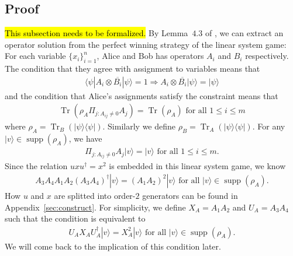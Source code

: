 \documentclass[11pt,letterpaper]{article}
\newcommand{\ket}[1]{|#1\rangle}
\newcommand{\bra}[1]{\langle#1|}
\newcommand{\ketbra}[2]{|#1\rangle\langle#2|}
\DeclareMathOperator{\Tr}{Tr}
\DeclareMathOperator{\supp}{supp}
\newcommand{\1}{\mathbb{1}}
\theoremstyle{definition}
\begin{document}
\subsection{Proof}
\hl{This subsection needs to be formalized.}
By Lemma~$4.3$ of \cite{coladan2017}, we can extract an operator solution from the perfect winning strategy 
of the linear system game: 
For each variable $\{ x_i \}_{i=1}^n$, Alice and Bob has operators $A_i$ and $B_i$ respectively.
The condition that they agree with assignment to variables means that 
\begin{align}
	\bra{\psi} A_i \otimes \overline{B_i} \ket{\psi} = 1 \Rightarrow A_i \otimes \overline{B_i} \ket{\psi} = \ket{\psi}
\end{align}
and the condition that Alice's assignments satisfy the constraint means that 
\begin{align}
	\Tr(\rho_A \Pi_{j: A_{ij} \neq 0} A_j) = \Tr(\rho_A) \text{ for all } 1 \leq i \leq m
\end{align}
where $\rho_A =  \Tr_B(\ketbra{\psi}{\psi})$. 
Similarly we define $\rho_B = \Tr_A(\ketbra{\psi}{\psi})$.
For any $\ket{v} \in \supp(\rho_A)$,
we have 
\begin{align}
\Pi_{j:A_{ij} \neq 0} A_j \ket{v} = \ket{v} \text{ for all } 1 \leq i \leq m.
\end{align}
Since the relation $uxu^\dagger = x^2$ is embedded in this linear system game, we know
\begin{align}
	A_3A_4 A_1A_2 (A_3A_4)^\dagger \ket{v}= (A_1A_2)^2 \ket{v} \text{ for all } \ket{v} \in \supp(\rho_A).
\end{align}
How $u$ and $x$ are splitted into order-$2$ generators can be found in Appendix~\ref{sec:construct}.
For simplicity, we define $X_A = A_1A_2$ and $U_A=A_3A_4$ such that
the condition is equivalent to
\begin{align}
	\label{eq:ux_relation}
	U_AX_AU_A^\dagger \ket{v} = X_A^2 \ket{v} \text{ for all } \ket{v} \in \supp(\rho_A).
\end{align}
We will come back to the implication of this condition later.
\end{document}
